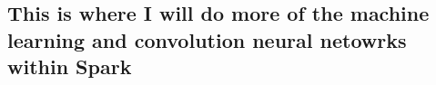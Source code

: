\documentclass[12pt]{article}
\newenvironment{Shaded}{\begin{snugshade}}{\end{snugshade}}
\newcommand{\CommentTok}[1]{\textcolor[rgb]{0.56,0.35,0.01}{\textit{#1}}}
\newcommand{\DataTypeTok}[1]{\textcolor[rgb]{0.13,0.29,0.53}{#1}}
\newcommand{\DecValTok}[1]{\textcolor[rgb]{0.00,0.00,0.81}{#1}}
\newcommand{\FloatTok}[1]{\textcolor[rgb]{0.00,0.00,0.81}{#1}}
\newcommand{\KeywordTok}[1]{\textcolor[rgb]{0.13,0.29,0.53}{\textbf{#1}}}
\newcommand{\NormalTok}[1]{#1}
\newcommand{\OperatorTok}[1]{\textcolor[rgb]{0.81,0.36,0.00}{\textbf{#1}}}
\newcommand{\StringTok}[1]{\textcolor[rgb]{0.31,0.60,0.02}{#1}}
\begin{document}
\begin{Shaded}
\end{Shaded}

\hypertarget{this-is-where-i-will-do-more-of-the-machine-learning-and-convolution-neural-netowrks-within-spark}{%
\subsection{This is where I will do more of the machine learning and
convolution neural netowrks within
Spark}\label{this-is-where-i-will-do-more-of-the-machine-learning-and-convolution-neural-netowrks-within-spark}}
\end{document}
